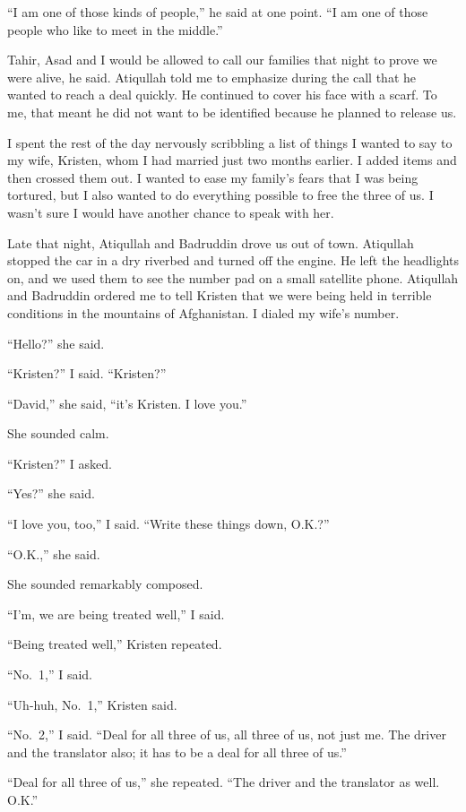 ﻿\documentclass[12pt]{article}
\begin{document}
``I am one of those kinds of people,'' he said at one point. ``I am one of those people who like to
meet in the middle.''

Tahir, Asad and I would be allowed to call our families that night to prove we were alive, he said.
Atiqullah told me to emphasize during the call that he wanted to reach a deal quickly. He continued
to cover his face with a scarf. To me, that meant he did not want to be identified because he
planned to release us.

I spent the rest of the day nervously scribbling a list of things I wanted to say to my wife,
Kristen, whom I had married just two months earlier. I added items and then crossed them out. I
wanted to ease my family's fears that I was being tortured, but I also wanted to do everything
possible to free the three of us. I wasn't sure I would have another chance to speak with her.

Late that night, Atiqullah and Badruddin drove us out of town. Atiqullah stopped the car in a dry
riverbed and turned off the engine. He left the headlights on, and we used them to see the number
pad on a small satellite phone. Atiqullah and Badruddin ordered me to tell Kristen that we were
being held in terrible conditions in the mountains of Afghanistan. I dialed my wife's number.

``Hello?'' she said.

``Kristen?'' I said. ``Kristen?''

``David,'' she said, ``it's Kristen. I love you.''

She sounded calm.

``Kristen?'' I asked.

``Yes?'' she said.

``I love you, too,'' I said. ``Write these things down, O.K.?''

``O.K.,'' she said.

She sounded remarkably composed.

``I'm, we are being treated well,'' I said.

``Being treated well,'' Kristen repeated.

``No.~1,'' I said.

``Uh-huh, No.~1,'' Kristen said.

``No.~2,'' I said. ``Deal for all three of us, all three of us, not just me. The driver and the
translator also; it has to be a deal for all three of us.''

``Deal for all three of us,'' she repeated. ``The driver and the translator as well. O.K.''
\end{document}
